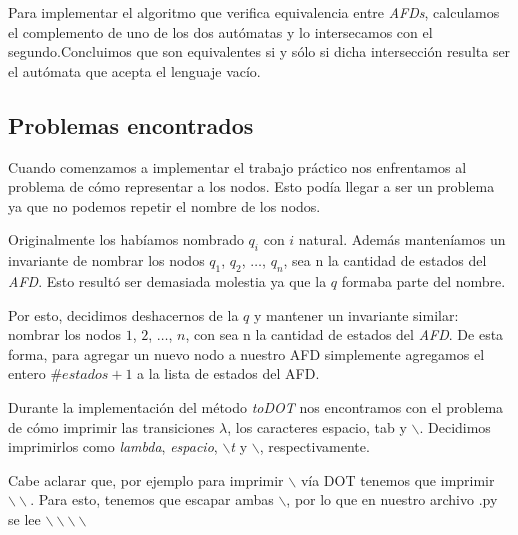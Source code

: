Para implementar el algoritmo que verifica equivalencia entre \emph{AFDs}, calculamos el complemento de uno de los dos autómatas y lo intersecamos con el segundo.Concluimos que son equivalentes si y sólo si dicha intersección resulta ser el autómata que acepta el lenguaje vacío.


\subsection{Problemas encontrados}

Cuando comenzamos a implementar el trabajo práctico nos enfrentamos al problema de cómo representar a los nodos. Esto podía llegar a ser un problema ya que no podemos repetir el nombre de los nodos.

Originalmente los habíamos nombrado \emph{$q_i$} con $i$ natural. Además manteníamos un invariante de nombrar los nodos $q_1$, $q_2$, $\hdots$, $q_n$, sea n la cantidad de estados del \emph{AFD}. Esto resultó ser demasiada molestia ya que la $q$ formaba parte del nombre.

Por esto, decidimos deshacernos de la $q$ y mantener un invariante similar: nombrar los nodos $1$, $2$, $\hdots$, $n$, con sea n la cantidad de estados del \emph{AFD}. De esta forma, para agregar un nuevo nodo a nuestro AFD simplemente agregamos el entero $\#estados + 1$ a la lista de estados del AFD.


Durante la implementación del método \emph{toDOT} nos encontramos con el problema de cómo imprimir las transiciones $\lambda$, los caracteres espacio, tab y $\backslash$. Decidimos imprimirlos como \emph{lambda}, \emph{espacio},  \emph{$\backslash$t} y $\backslash$, respectivamente.

Cabe aclarar que, por ejemplo para imprimir $\backslash$ vía DOT tenemos que imprimir $\backslash\backslash$. Para esto, tenemos que escapar ambas $\backslash$, por lo que en nuestro archivo .py se lee $\backslash\backslash\backslash\backslash$



